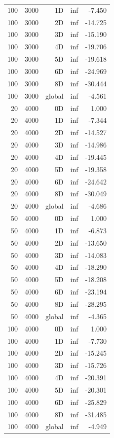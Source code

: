 \begin{longtable}{rrrrr}
100 & 3000 & 1D & inf & -7.450 \\
100 & 3000 & 2D & inf & -14.725 \\
100 & 3000 & 3D & inf & -15.190 \\
100 & 3000 & 4D & inf & -19.706 \\
100 & 3000 & 5D & inf & -19.618 \\
100 & 3000 & 6D & inf & -24.969 \\
100 & 3000 & 8D & inf & -30.444 \\
100 & 3000 & global & inf & -4.561 \\
20 & 4000 & 0D & inf & 1.000 \\
20 & 4000 & 1D & inf & -7.344 \\
20 & 4000 & 2D & inf & -14.527 \\
20 & 4000 & 3D & inf & -14.986 \\
20 & 4000 & 4D & inf & -19.445 \\
20 & 4000 & 5D & inf & -19.358 \\
20 & 4000 & 6D & inf & -24.642 \\
20 & 4000 & 8D & inf & -30.049 \\
20 & 4000 & global & inf & -4.686 \\
50 & 4000 & 0D & inf & 1.000 \\
50 & 4000 & 1D & inf & -6.873 \\
50 & 4000 & 2D & inf & -13.650 \\
50 & 4000 & 3D & inf & -14.083 \\
50 & 4000 & 4D & inf & -18.290 \\
50 & 4000 & 5D & inf & -18.208 \\
50 & 4000 & 6D & inf & -23.194 \\
50 & 4000 & 8D & inf & -28.295 \\
50 & 4000 & global & inf & -4.365 \\
100 & 4000 & 0D & inf & 1.000 \\
100 & 4000 & 1D & inf & -7.730 \\
100 & 4000 & 2D & inf & -15.245 \\
100 & 4000 & 3D & inf & -15.726 \\
100 & 4000 & 4D & inf & -20.391 \\
100 & 4000 & 5D & inf & -20.301 \\
100 & 4000 & 6D & inf & -25.829 \\
100 & 4000 & 8D & inf & -31.485 \\
100 & 4000 & global & inf & -4.949 \\
\end{longtable}
